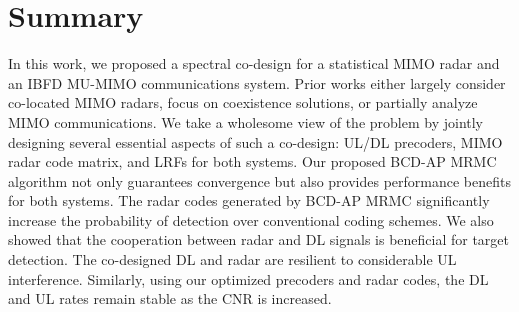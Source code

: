 \documentclass[10pt,journal]{IEEEtran}
\theoremstyle{definition}
\begin{document}
		\section{Summary}
		\label{sec:conclusion}
		In this work, we proposed a spectral co-design for a statistical MIMO radar and an IBFD MU-MIMO communications system. Prior works either largely consider co-located MIMO radars, focus on coexistence solutions, or partially analyze MIMO communications. We take a wholesome view of the problem by jointly designing several essential aspects of such a co-design:  UL/DL precoders, MIMO radar code matrix, and LRFs for both systems. Our proposed BCD-AP MRMC algorithm not only guarantees convergence but also provides performance benefits for both systems. %
		The radar codes generated by BCD-AP MRMC significantly increase the probability of detection over conventional coding schemes. We also showed that the cooperation between radar and DL signals is beneficial for target detection. The co-designed DL and radar are resilient to considerable UL interference. Similarly, using our optimized precoders and radar codes, the DL and UL rates remain stable as the CNR is increased. %
		
\end{document}
